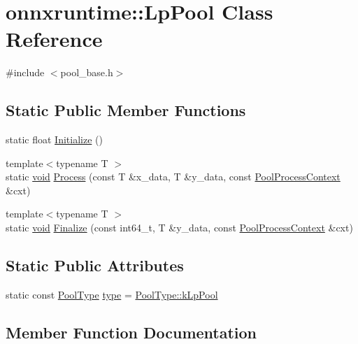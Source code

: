 \hypertarget{classonnxruntime_1_1LpPool}{}\section{onnxruntime\+:\+:Lp\+Pool Class Reference}
\label{classonnxruntime_1_1LpPool}


{\ttfamily \#include $<$pool\+\_\+base.\+h$>$}

\subsection*{Static Public Member Functions}
\begin{DoxyCompactItemize}
\item 
static float \mbox{\hyperlink{classonnxruntime_1_1LpPool_a95e4b48f5d30740b52d62675f4aeaf14}{Initialize}} ()
\item 
{\footnotesize template$<$typename T $>$ }\\static \mbox{\hyperlink{mlasi_8h_a88f941d423cb2a819b70a1358982b1a6}{void}} \mbox{\hyperlink{classonnxruntime_1_1LpPool_a4cdfce18edaf2fb76ca549f487878a24}{Process}} (const T \&x\+\_\+data, T \&y\+\_\+data, const \mbox{\hyperlink{classonnxruntime_1_1PoolProcessContext}{Pool\+Process\+Context}} \&cxt)
\item 
{\footnotesize template$<$typename T $>$ }\\static \mbox{\hyperlink{mlasi_8h_a88f941d423cb2a819b70a1358982b1a6}{void}} \mbox{\hyperlink{classonnxruntime_1_1LpPool_a7e139347e30f90d425a66ad3694e330e}{Finalize}} (const int64\+\_\+t, T \&y\+\_\+data, const \mbox{\hyperlink{classonnxruntime_1_1PoolProcessContext}{Pool\+Process\+Context}} \&cxt)
\end{DoxyCompactItemize}
\subsection*{Static Public Attributes}
\begin{DoxyCompactItemize}
\item 
static const \mbox{\hyperlink{namespaceonnxruntime_aa4ff52f19ea8c4d3e4ce3ffbabbc7060}{Pool\+Type}} \mbox{\hyperlink{classonnxruntime_1_1LpPool_a9953e01493d041c462c59a49e6d6f007}{type}} = \mbox{\hyperlink{namespaceonnxruntime_aa4ff52f19ea8c4d3e4ce3ffbabbc7060a386cc7744fd4f4a934f933df6d105fd4}{Pool\+Type\+::k\+Lp\+Pool}}
\end{DoxyCompactItemize}


\subsection{Member Function Documentation}
\mbox{\label{classonnxruntime_1_1LpPool_a7e139347e30f90d425a66ad3694e330e}} 
